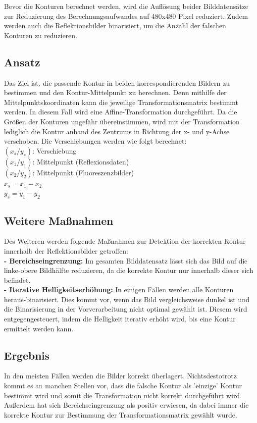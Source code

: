 \documentclass[conference]{IEEEtran}
\begin{document}
Bevor die Konturen berechnet werden, wird die Auflösung beider Bilddatensätze zur Reduzierung des Berechnungsaufwandes auf 480x480 Pixel reduziert. Zudem werden auch die Reflektionsbilder binarisiert, um die Anzahl der falschen Konturen zu reduzieren. 

\subsection{Ansatz}

Das Ziel ist, die passende Kontur in beiden korrespondierenden Bildern zu bestimmen und den Kontur-Mittelpunkt zu berechnen. Denn mithilfe der Mittelpunktskoordinaten kann die jeweilige Transformationsmatrix bestimmt werden. In diesem Fall wird eine Affine-Transformation durchgeführt. Da die Größen der Konturen ungefähr übereinstimmen, wird mit der Transformation lediglich die Kontur anhand des Zentrums in Richtung der x- und y-Achse verschoben. Die Verschiebungen werden wie folgt berechnet: \\

$(x_s/y_s)$: Verschiebung \\
$(x_1/y_1)$: Mittelpunkt (Reflexionsdaten) \\
$(x_2/y_2)$: Mittelpunkt (Fluoreszenzbilder) \\
$x_s = x_1 - x_2$ \\
$y_s = y_1 - y_2$ \\

\subsection{Weitere Maßnahmen}

Des Weiteren werden folgende Maßnahmen zur Detektion der korrekten Kontur innerhalb der Reflektionsbilder getroffen: \\

\textbf{- Bereichseingrenzung:} Im gesamten Bilddatensatz lässt sich das Bild auf die linke-obere Bildhälfte reduzieren, da die korrekte Kontur nur innerhalb dieser sich befindet. \\

\textbf{- Iterative Helligkeitserhöhung:} In einigen Fällen werden alle Konturen heraus-binarisiert. Dies kommt vor, wenn das Bild vergleichsweise dunkel ist und die Binarisierung in der Vorverarbeitung nicht optimal gewählt ist. Diesem wird entgegengesteuert, indem die Helligkeit iterativ erhöht wird, bis eine Kontur ermittelt werden kann.  \\

\subsection{Ergebnis}

In den meisten Fällen werden die Bilder korrekt überlagert. Nichtsdestotrotz kommt es an manchen Stellen vor, dass die falsche Kontur als 'einzige' Kontur bestimmt wird und somit die Transformation nicht korrekt durchgeführt wird. Außerdem hat sich Bereichseingrenzung als positiv erwiesen, da dabei immer die korrekte Kontur zur Bestimmung der Transformationsmatrix gewählt wurde.
\end{document}
